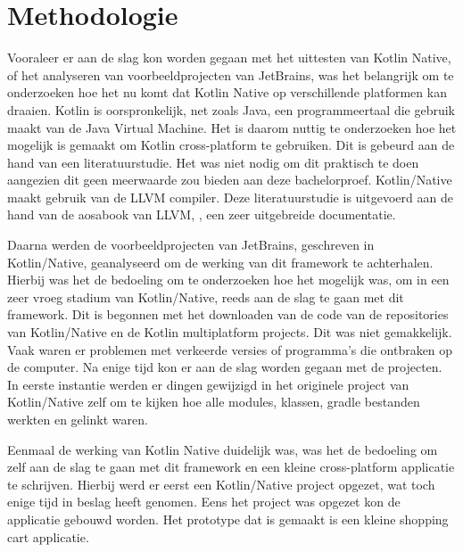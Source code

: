 
\chapter{Methodologie}
\label{ch:methodologie}


Vooraleer er aan de slag kon worden gegaan met het uittesten van Kotlin Native, of het analyseren van voorbeeldprojecten van JetBrains, was het belangrijk om te onderzoeken hoe het nu komt dat Kotlin Native op verschillende platformen kan draaien. Kotlin is oorspronkelijk, net zoals Java, een programmeertaal die gebruik maakt van de Java Virtual Machine. Het is daarom nuttig te onderzoeken hoe het mogelijk is gemaakt om Kotlin cross-platform te gebruiken. Dit is gebeurd aan de hand van een literatuurstudie. Het was niet nodig om dit praktisch te doen aangezien dit geen meerwaarde zou bieden aan deze bachelorproef. Kotlin/Native maakt gebruik van de LLVM compiler. Deze literatuurstudie is uitgevoerd aan de hand van de aosabook van LLVM, \textcite{aosa}, een zeer uitgebreide documentatie. 

Daarna werden de voorbeeldprojecten van JetBrains, geschreven in Kotlin/Native, geanalyseerd om de werking van dit framework te achterhalen. Hierbij was het de bedoeling om te onderzoeken hoe het mogelijk was, om in een zeer vroeg stadium van Kotlin/Native, reeds aan de slag te gaan met dit framework. Dit is begonnen met het downloaden van de code van de repositories van Kotlin/Native en de Kotlin multiplatform projects. Dit was niet gemakkelijk. Vaak waren er problemen met verkeerde versies of programma's die ontbraken op de computer. Na enige tijd kon er aan de slag worden gegaan met de projecten. In eerste instantie werden er dingen gewijzigd in het originele project van Kotlin/Native zelf om te kijken hoe alle modules, klassen, gradle bestanden werkten en gelinkt waren.

Eenmaal de werking van Kotlin Native duidelijk was, was het de bedoeling om zelf aan de slag te gaan met dit framework en een kleine cross-platform applicatie te schrijven. Hierbij werd er eerst een Kotlin/Native project opgezet, wat toch enige tijd in beslag heeft genomen. Eens het project was opgezet kon de applicatie gebouwd worden. Het prototype dat is gemaakt is een kleine shopping cart applicatie.

